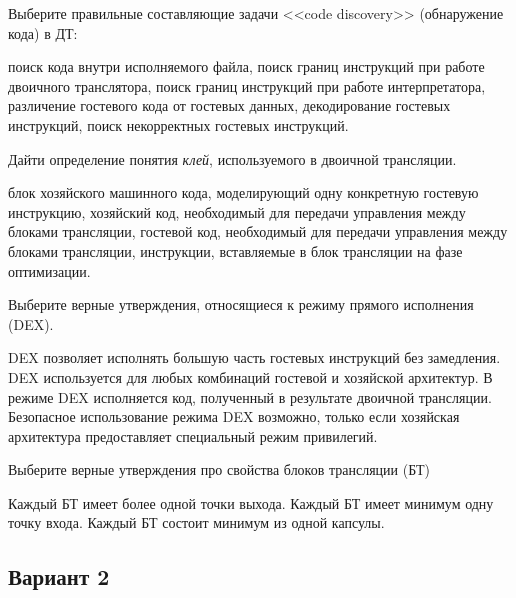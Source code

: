 \begin{questions}
\question[3] Выберите правильные составляющие задачи <<code discovery>> (обнаружение кода) в ДТ:
\begin{choices}
    \choice поиск кода внутри исполняемого файла,
    \correctchoice поиск границ инструкций при работе двоичного транслятора,
    \choice     поиск границ инструкций при работе интерпретатора,
    \correctchoice различение гостевого кода от гостевых данных,
    \choice     декодирование гостевых инструкций,
    \choice поиск некорректных гостевых инструкций.
\end{choices}

\question[3] Дайти определение понятия \emph{клей}, используемого в двоичной трансляции.
\begin{choices}
    \choice блок хозяйского машинного кода, моделирующий одну конкретную гостевую инструкцию,
    \correctchoice хозяйский код, необходимый для передачи управления между блоками трансляции,
    \choice гостевой код, необходимый для передачи управления между блоками трансляции,
    \choice инструкции, вставляемые в блок трансляции на фазе оптимизации.
\end{choices}

\question[3] Выберите верные утверждения, относящиеся к режиму прямого исполнения (DEX).
\begin{choices}
\correctchoice DEX позволяет исполнять большую часть гостевых инструкций без замедления.
\choice DEX используется для любых комбинаций гостевой и хозяйской архитектур.
\choice В режиме DEX исполняется код, полученный в результате двоичной трансляции.
\correctchoice Безопасное использование режима DEX возможно, только если хозяйская архитектура предоставляет специальный режим привилегий.
\end{choices}

\question[3] Выберите верные утверждения про свойства блоков трансляции (БТ)
\begin{choices}
    \choice Каждый БТ имеет более одной точки выхода.
    \correctchoice Каждый БТ имеет минимум одну точку входа.
    \correctchoice Каждый БТ состоит минимум из одной капсулы.
\end{choices}

\end{questions}

\subsection*{Вариант 2}

